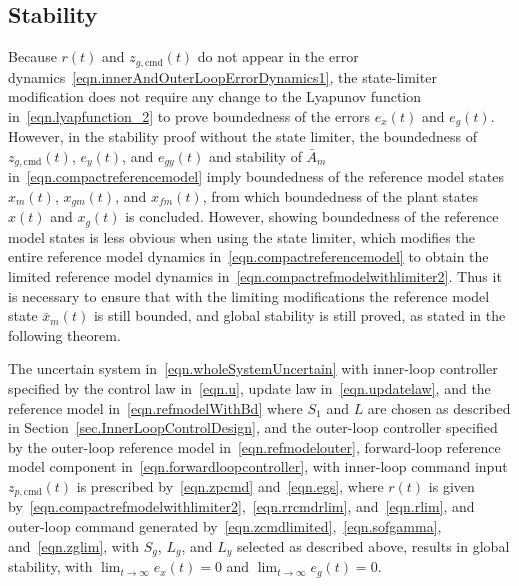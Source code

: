 \documentclass[journal]{IEEEtran}
\theoremstyle{innercustomthm}
\begin{document}
  \subsection{Stability}

  Because $r(t)$ and $z_{g,\text{cmd}}(t)$ do not appear in the error dynamics\ \eqref{eqn.innerAndOuterLoopErrorDynamics1}, the state-limiter modification does not require any change to the Lyapunov function in\ \eqref{eqn.lyapfunction_2} to prove boundedness of the errors $e_{x}(t)$ and $e_{g}(t)$.
  However, in the stability proof without the state limiter, the boundedness of $z_{g,\text{cmd}}(t)$, $e_{y}(t)$, and $e_{gy}(t)$ and stability of $\bar{A}_{m}$ in\ \eqref{eqn.compactreferencemodel} imply boundedness of the reference model states $x_{m}(t)$, $x_{gm}(t)$, and $x_{fm}(t)$, from which boundedness of the plant states $x(t)$ and $x_{g}(t)$ is concluded.
  However, showing boundedness of the reference model states is less obvious when using the state limiter, which modifies the entire reference model dynamics in\ \eqref{eqn.compactreferencemodel} to obtain the limited reference model dynamics in\ \eqref{eqn.compactrefmodelwithlimiter2}.
  Thus it is necessary to ensure that with the limiting modifications the reference model state $\bar{x}_{m}(t)$ is still bounded, and global stability is still proved, as stated in the following theorem.

  \begin{thm-dan}\label{thm.outerlooplimiter}
    The uncertain system in\ \eqref{eqn.wholeSystemUncertain} with inner-loop controller specified by the control law in\ \eqref{eqn.u}, update law in\ \eqref{eqn.updatelaw}, and the reference model in\ \eqref{eqn.refmodelWithBd} where $S_{1}$ and $L$ are chosen as described in Section~\ref{sec.InnerLoopControlDesign}, and the outer-loop controller specified by the outer-loop reference model in\ \eqref{eqn.refmodelouter}, forward-loop reference model component in\ \eqref{eqn.forwardloopcontroller}, with inner-loop command input $z_{p,\text{cmd}}(t)$ is prescribed by\ \eqref{eqn.zpcmd} and\ \eqref{eqn.egs}, where $r(t)$ is given by\ \eqref{eqn.compactrefmodelwithlimiter2},\ \eqref{eqn.rrcmdrlim}, and\ \eqref{eqn.rlim}, and outer-loop command generated by\ \eqref{eqn.zcmdlimited},\ \eqref{eqn.sofgamma}, and\ \eqref{eqn.zglim}, with $S_{g}$, $L_{g}$, and $L_{y}$ selected as described above, results in global stability, with $\lim_{t\rightarrow\infty}e_{x}(t)=0$ and $\lim_{t\rightarrow\infty}e_{g}(t)=0$.
  \end{thm-dan}
\end{document}
